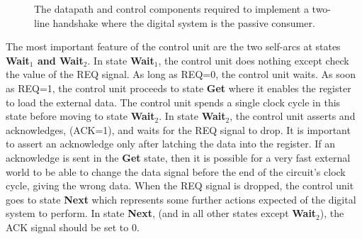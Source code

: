 \begin{figure}[ht]
\caption{The datapath and control components required to implement
a two-line handshake where the digital system is the passive consumer.}
\label{fig:2Line}
\end{figure}

The most important feature of the control unit are the two self-arcs
at states {\bf Wait$_1$ and Wait$_2$}.  In state {\bf Wait$_1$}, the
control unit does nothing except check the value of the REQ signal.
As long as REQ=0, the control unit waits.  As soon as REQ=1,
the control unit proceeds to state {\bf Get} where it enables
the register to load the external data.  The control unit spends a single 
clock cycle in this state before moving to state {\bf Wait$_2$}.  In
state {\bf Wait$_2$}, the control unit asserts and acknowledges,
(ACK=1), and waits for the REQ signal to drop.  It is important
to assert an acknowledge only after latching the data into
the register.  If an acknowledge is sent in the {\bf Get} state,
then it is possible for a very fast external world to be
able to change the data signal before the end of the circuit's 
clock cycle, giving the wrong data.  When the REQ signal is 
dropped, the control unit goes to state {\bf Next} which represents 
some further actions expected of the digital system to perform. In 
state {\bf Next}, (and in all other states except {\bf Wait$_2$}), 
the ACK signal should be set to 0.  

